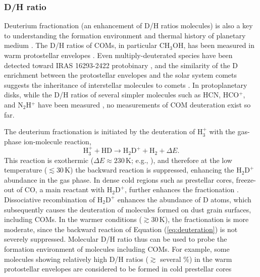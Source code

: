 \documentclass[linenumbers, twocolumn, twocolappendix, astrosymb, times]{aastex631}
\newcommand{\methanol}{CH$_3$OH\xspace}
\begin{document}
\subsubsection{D/H ratio}
Deuterium fractionation (an enhancement of D/H ratios molecules) is also a key to understanding the formation environment and thermal history of planetary medium \citep[e.g.,][]{Ceccarelli2014, Nomura2023_PPVII}. The D/H ratios of COMs, in particular \methanol, has been measured in warm protostellar envelopes \citep[e.g.,][]{Jorgensen2018, Drozdovskaya2021}. Even multiply-deuterated species have been detected toward IRAS 16293-2422 protobinary \citep[e.g.,][]{Manigand2019, Richard2021, Drozdovskaya2022}, and the similarity of the D enrichment between the protostellar envelopes and the solar system comets suggests the inheritance of interstellar molecules to comets \citep{Drozdovskaya2021}. In protoplanetary disks, while the D/H ratios of several simpler molecules such as HCN, HCO$^{+}$, and N$_2$H$^{+}$ have been measured \citep[e.g.,][see also \citealt{Aikawa2022}]{Cataldi2021}, no measurements of COM deuteration exist so far. 


The deuterium fractionation is initiated by the deuteration of $\mathrm{H_3^+}$ with the gas-phase ion-molecule reaction, 
\begin{equation}\label{eq:deuteration}
    \mathrm{H}_3^+ + \mathrm{HD} \rightarrow \mathrm{H_2D^+} + \mathrm{H_2} + \Delta E.
\end{equation}
This reaction is exothermic ($\Delta E \approx 230$\,K; e.g., \citealt{Millar1989}), and therefore at the low temperature ($\lesssim 30$\,K) the backward reaction is suppressed, enhancing the $\mathrm{H_2D^+}$ abundance in the gas phase. In dense cold regions such as prestellar cores, freeze-out of CO, a main reactant with $\mathrm{H_2D^+}$, further enhances the fractionation \citep[e.g.,][]{Roberts2000}. Dissociative recombination of $\mathrm{H_2D^+}$ enhances the abundance of D atoms, which subsequently causes the deuteration of molecules formed on dust grain surfaces, including COMs. In the warmer conditions ($\gtrsim 30$\,K), the fractionation is more moderate, since the backward reaction of Equation (\ref{eq:deuteration}) is not severely suppressed. Molecular D/H ratio thus can be used to probe the formation environment of molecules including COMs. For example, some molecules showing relatively high D/H ratios ($\gtrsim$ several \%) in the warm protostellar envelopes are considered to be formed in cold prestellar cores \citep[e.g.,][]{Jorgensen2018, Yamato2022}
\end{document}
